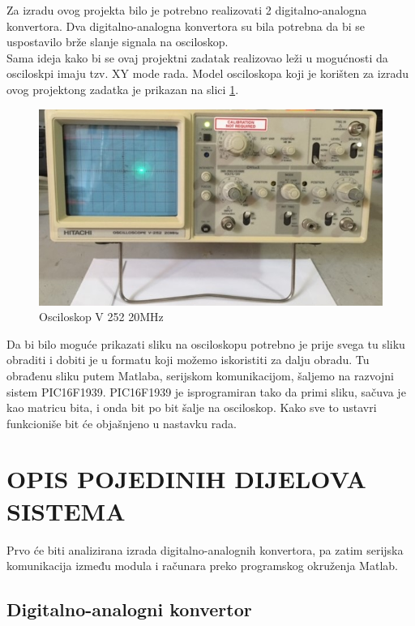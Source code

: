 \documentclass[12pt]{article}
\begin{document}
Za izradu ovog projekta bilo je potrebno realizovati 2 digitalno-analogna konvertora. Dva digitalno-analogna konvertora su bila potrebna da bi se uspostavilo brže slanje signala na osciloskop.\\ 
Sama ideja kako bi se ovaj projektni zadatak realizovao leži u mogućnosti da osciloskpi imaju tzv. XY mode rada. Model osciloskopa koji je korišten za izradu ovog projektong zadatka je prikazan na slici \ref{fig:osci}.
\renewcommand{\figurename}{Slika}

\begin{figure}[h!]
    \centering
  \includegraphics[scale=0.4]{osciloskop.jpg}
  \caption{Osciloskop V 252 20MHz}
  \label{fig:osci}
\end{figure}
\newline

Da bi bilo moguće prikazati sliku na osciloskopu potrebno je prije svega tu sliku obraditi i dobiti je u formatu koji možemo iskoristiti za dalju obradu. Tu obrađenu sliku putem Matlaba, serijskom komunikacijom, šaljemo na razvojni sistem PIC16F1939. PIC16F1939 je isprogramiran tako da primi sliku, sačuva je kao matricu bita, i onda bit po bit šalje na osciloskop. Kako sve to ustavri funkcioniše bit će objašnjeno u nastavku rada.
\pagebreak
\section{OPIS POJEDINIH DIJELOVA SISTEMA}

Prvo će biti analizirana izrada digitalno-analognih konvertora, pa zatim serijska komunikacija između modula i računara preko programskog okruženja Matlab.
\subsection{Digitalno-analogni konvertor}
\end{document}
